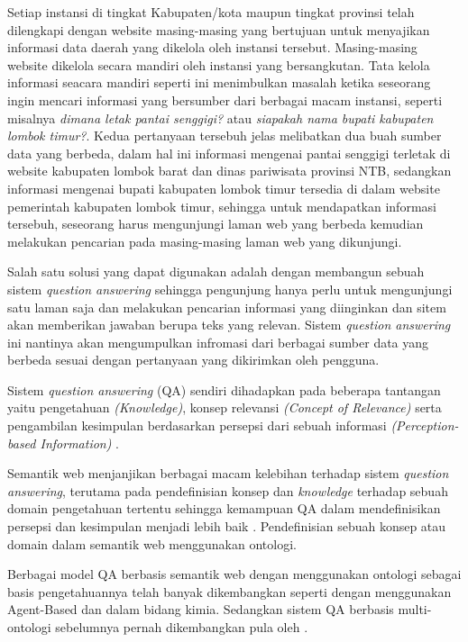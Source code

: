 Setiap instansi di tingkat Kabupaten/kota maupun tingkat provinsi telah dilengkapi dengan website masing-masing yang bertujuan untuk menyajikan informasi data daerah yang dikelola oleh instansi tersebut. Masing-masing website dikelola secara mandiri oleh instansi yang bersangkutan. Tata kelola informasi seacara mandiri seperti ini menimbulkan masalah ketika seseorang ingin mencari informasi yang bersumber dari berbagai macam instansi, seperti misalnya \emph{dimana letak pantai senggigi?} atau \emph{siapakah nama bupati kabupaten lombok timur?}. Kedua pertanyaan tersebuh jelas melibatkan dua buah sumber data yang berbeda, dalam hal ini informasi mengenai pantai senggigi terletak di website kabupaten lombok barat dan dinas pariwisata provinsi NTB, sedangkan informasi mengenai bupati kabupaten lombok timur tersedia di dalam website pemerintah kabupaten lombok timur, sehingga untuk mendapatkan informasi tersebuh, seseorang harus mengunjungi laman web yang berbeda kemudian melakukan pencarian pada masing-masing laman web yang dikunjungi. 

Salah satu solusi yang dapat digunakan adalah dengan membangun sebuah sistem \textit{question answering} sehingga pengunjung hanya perlu untuk mengunjungi satu laman saja dan melakukan pencarian informasi yang diinginkan dan sitem akan memberikan jawaban berupa teks yang relevan. Sistem \emph{question answering} ini nantinya akan mengumpulkan infromasi dari berbagai sumber data yang berbeda sesuai dengan pertanyaan yang dikirimkan oleh pengguna.

Sistem \textit{question answering} (QA) sendiri dihadapkan pada beberapa tantangan yaitu pengetahuan \textit{(Knowledge)}, konsep relevansi \textit{(Concept of Relevance)} serta pengambilan kesimpulan berdasarkan persepsi dari sebuah informasi \textit{(Perception-based Information)} \citep{zadeh}.

Semantik web menjanjikan berbagai macam kelebihan terhadap sistem \textit{question answering}, terutama pada pendefinisian konsep dan \textit{knowledge} terhadap sebuah domain pengetahuan tertentu sehingga kemampuan QA dalam mendefinisikan persepsi dan kesimpulan menjadi lebih baik \citep*{guo_zhang}. Pendefinisian sebuah konsep atau domain dalam semantik web menggunakan ontologi.

Berbagai model QA berbasis semantik web dengan menggunakan ontologi sebagai basis pengetahuannya telah banyak dikembangkan seperti \citet*{guo_zhang} dengan menggunakan Agent-Based dan \citet*{angele} dalam bidang kimia. Sedangkan sistem QA berbasis multi-ontologi sebelumnya pernah dikembangkan pula oleh \citet*{lopez}.

